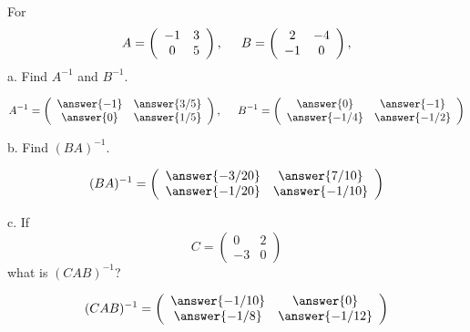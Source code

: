 \documentclass{ximera}
\author{Parisa Fatheddin}
\begin{document}
\begin{exercise}
For
\[ A= \left(\begin{array}{cc}
  -1 & 3   \\
  0 &  5
\end{array}\right), \hspace{.5cm} B= \left(\begin{array}{cc}
  2 & -4   \\
  -1 &  0
\end{array}\right),
\]
a. Find $A^{-1}$ and $B^{-1}$.

\begin{prompt}
\[ A^{-1}= \left(\begin{array}{cc}
  \answer{-1} & \answer{3/5}   \\
  \answer{0} & \answer{1/5}
\end{array}\right), \hspace{.5cm} B^{-1}= \left(\begin{array}{cc}
  \answer{0} & \answer{-1}   \\
  \answer{-1/4} & \answer{-1/2}
\end{array}\right)\]
\end{prompt}

b. Find $(BA)^{-1}$.

\begin{prompt}
\[(BA)^{-1} = \left(\begin{array}{cc}
  \answer{-3/20} & \answer{7/10}   \\
  \answer{-1/20} & \answer{-1/10}
\end{array}\right)
\]
\end{prompt}

c. If
\[C = \left(\begin{array}{cc}
  0&2\\
  -3&0
\end{array}\right)
\]
what is $(CAB)^{-1}$?

\begin{prompt}
\[(CAB)^{-1}= \left(\begin{array}{cc}
  \answer{-1/10} & \answer{0}   \\
  \answer{-1/8} & \answer{-1/12}
\end{array}\right)
\]
\end{prompt}
\end{exercise}
\end{document}
